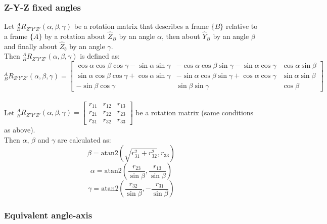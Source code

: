 \documentclass[10pt,a4paper]{article}
\newcommand{\vect}[1]{\ensuremath{\begin{bmatrix}#1\end{bmatrix}}}
\newcommand{\atan}{\ensuremath{\mathrm{atan2 }}}
\begin{document}
\subsubsection{Z-Y-Z fixed angles}
Let $^A_BR_{Z'Y'Z'}(\alpha, \beta, \gamma)$ be a rotation matrix that describes a frame $\{B\}$ relative to a frame $\{A\}$ by a rotation about $\hat{Z}_B$ by an angle $\alpha$, then about $\hat{Y}_B$ by an angle $\beta$ and finally about $\hat{Z}_b$ by an angle $\gamma$. \\
Then $^A_BR_{Z'Y'Z'}(\alpha, \beta, \gamma)$ is defined as:
$$
^A_BR_{Z'Y'Z'}(\alpha, \beta, \gamma) = \begin{bmatrix}
\cos \alpha \cos \beta \cos \gamma - \sin \alpha \sin \gamma & - \cos \alpha \cos \beta \sin \gamma - \sin \alpha \cos \gamma & \cos \alpha \sin \beta \\
\sin \alpha \cos \beta \cos \gamma + \cos \alpha \sin \gamma & -\sin \alpha \cos \beta \sin \gamma + \cos \alpha \cos \gamma & \sin \alpha \sin \beta \\
- \sin \beta \cos \gamma & \sin \beta \sin \gamma & \cos \beta
\end{bmatrix}
$$
\\

Let $^A_BR_{Z'Y'Z'}(\alpha, \beta, \gamma) = \vect{r_{11} & r_{12} & r_{13} \\ r_{21} & r_{22} & r_{23} \\ r_{31} & r_{32} & r_{33}}$ be a rotation matrix (same conditions as above). \\
Then $\alpha$, $\beta$ and $\gamma$ are calculated as:
$$
\beta = \atan (\sqrt{r_{31}^2 + r_{32}^2}, r_{33})
$$
$$
\alpha = \atan (\frac{r_{23}}{\sin \beta}, \frac{r_{13}}{\sin \beta})
$$
$$
\gamma = \atan (\frac{r_{32}}{\sin \beta}, -\frac{r_{31}}{\sin \beta})
$$

\subsubsection{Equivalent angle-axis}
\end{document}
